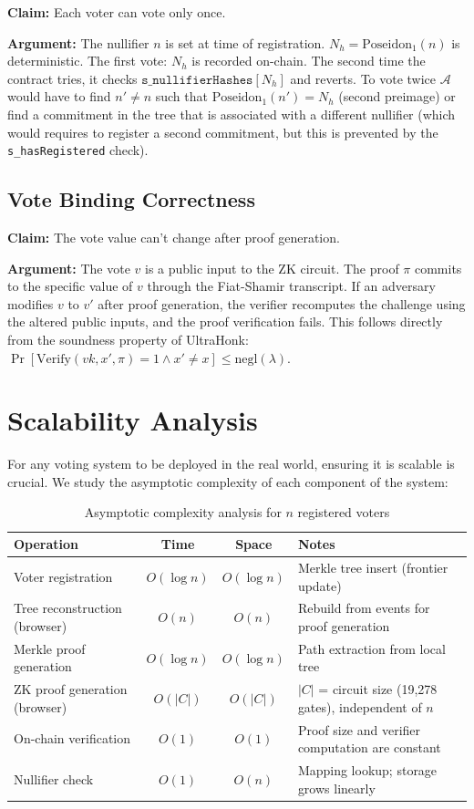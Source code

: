 \documentclass[12pt, a4paper]{report}
\begin{document}
\textbf{Claim:} Each voter can vote only once.

\textbf{Argument:} The nullifier $n$ is set at time of registration. $N_h = \text{Poseidon}_1(n)$ is deterministic. The first vote: $N_h$ is recorded on-chain. The second time the contract tries, it checks $\texttt{s\_nullifierHashes}[N_h]$ and reverts. To vote twice $\mathcal{A}$ would have to find $n' \neq n$ such that $\text{Poseidon}_1(n') = N_h$ (second preimage) or find a commitment in the tree that is associated with a different nullifier (which would requires to register a second commitment, but this is prevented by the \texttt{s\_hasRegistered} check).

\subsection{Vote Binding Correctness}

\textbf{Claim:} The vote value can't change after proof generation.

\textbf{Argument:} The vote $v$ is a public input to the ZK circuit. The proof $\pi$ commits to the specific value of $v$ through the Fiat-Shamir transcript. If an adversary modifies $v$ to $v'$ after proof generation, the verifier recomputes the challenge using the altered public inputs, and the proof verification fails. This follows directly from the soundness property of UltraHonk: $\Pr[\text{Verify}(vk, x', \pi) = 1 \wedge x' \neq x] \leq \text{negl}(\lambda)$.

\newpage
\section{Scalability Analysis}

For any voting system to be deployed in the real world, ensuring it is scalable is crucial. We study the asymptotic complexity of each component of the system:

\begin{table}[H]
\centering
\caption{Asymptotic complexity analysis for $n$ registered voters}
\label{tab:complexity}
\begin{tabular}{|l|c|c|p{4.5cm}|}
\hline
\textbf{Operation} & \textbf{Time} & \textbf{Space} & \textbf{Notes} \\ \hline
Voter registration & $O(\log n)$ & $O(\log n)$ & Merkle tree insert (frontier update) \\ \hline
Tree reconstruction (browser) & $O(n)$ & $O(n)$ & Rebuild from events for proof generation \\ \hline
Merkle proof generation & $O(\log n)$ & $O(\log n)$ & Path extraction from local tree \\ \hline
ZK proof generation (browser) & $O(|C|)$ & $O(|C|)$ & $|C|$ = circuit size (19,278 gates), independent of $n$ \\ \hline
On-chain verification & $O(1)$ & $O(1)$ & Proof size and verifier computation are constant \\ \hline
Nullifier check & $O(1)$ & $O(n)$ & Mapping lookup; storage grows linearly \\ \hline
\end{tabular}
\end{table}
\end{document}
